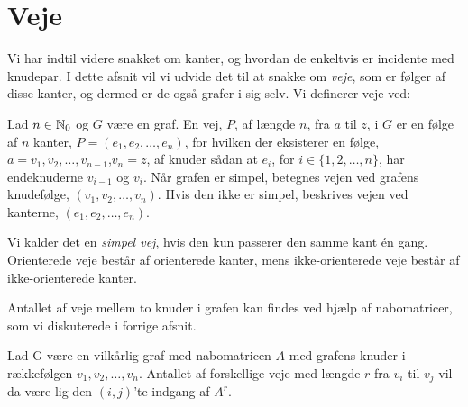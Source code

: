 \section{Veje}
Vi har indtil videre snakket om kanter, og hvordan de enkeltvis er incidente med knudepar. I dette afsnit vil vi udvide det til at snakke om \emph{veje}, som er følger af disse kanter, og dermed er de også grafer i sig selv. Vi definerer veje ved:
\begin{defn}
[Veje] 
Lad $n \in \mathbb{N} _0$  og $G$ være en graf. En vej, $P$, af længde $n$, fra $a$ til $z$, i $G$ er en følge af $n$ kanter,  $ P= (e_{1},e_{2},\dotsc,e_{n})$, for hvilken der eksisterer en følge, $a=v_{1},v_{2},\dotsc,v_{n-1}$,$v_{n}=z$, af knuder sådan at $e_{i}$, for $i \in \{1,2,\dotsc,n \}$, har endeknuderne $v_{i-1}$ og $v_{i}$. Når grafen er simpel, betegnes vejen ved grafens knudefølge, $(v_{1},v_{2},\dotsc,v_{n})$. Hvis den ikke er simpel, beskrives vejen ved kanterne, $(e_{1},e_{2},\dotsc,e_{n})$. 
\end{defn}
Vi kalder det en \emph{simpel vej}, hvis den kun passerer den samme kant én gang. Orienterede veje består af orienterede kanter, mens ikke-orienterede veje består af ikke-orienterede kanter.



Antallet af veje mellem to knuder i grafen kan findes ved hjælp af nabomatricer, som vi diskuterede i forrige afsnit.
\begin{thm}
Lad G være en vilkårlig graf med nabomatricen
\textbf{$A$} med grafens knuder i rækkefølgen $v_{1},v_{2},\dotsc,v_{n}$. Antallet af forskellige veje med længde $r$ fra $v_{i}$ til $v_{j}$ vil da være lig den $(i,j)$'te indgang af \textbf{$A^{r}$}.
\end{thm}

